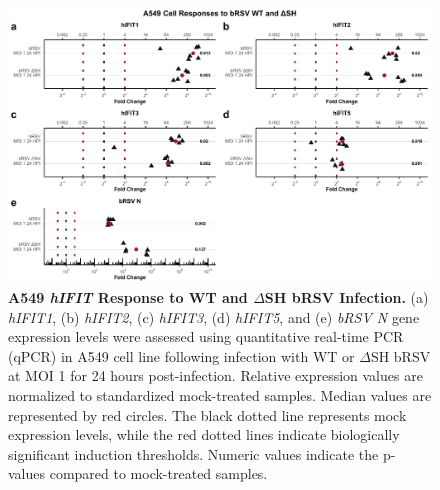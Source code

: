 \begin{figure}
    \centering
    \includegraphics[width=1\linewidth]{06. Chapter 1/Figs/01. Induction/09. a549_brsv_moi1.pdf}
    \caption[A549 \textit{hIFIT} Response to WT and \(\Delta\)SH bRSV Infection.]{\textbf{A549 \textit{hIFIT} Response to WT and \(\Delta\)SH bRSV Infection.} (a) \textit{hIFIT1}, (b) \textit{hIFIT2}, (c) \textit{hIFIT3}, (d) \textit{hIFIT5}, and (e) \textit{bRSV N} gene expression levels were assessed using quantitative real-time PCR (qPCR) in A549 cell line following infection with WT or \(\Delta\)SH bRSV at MOI 1 for 24 hours post-infection. Relative expression values are normalized to standardized mock-treated samples. Median values are represented by red circles. The black dotted line represents mock expression levels, while the red dotted lines indicate biologically significant induction thresholds. Numeric values indicate the p-values compared to mock-treated samples.}
    \label{fig:Responses of A549 to bRSV WT and dSH.}
\end{figure}

